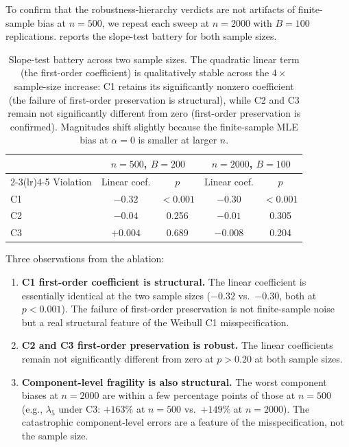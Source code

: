 To confirm that the robustness-hierarchy verdicts are not artifacts of
finite-sample bias at $n = 500$, we repeat each sweep at $n = 2000$ with
$B = 100$ replications.  reports the
slope-test battery for both sample sizes.

\begin{table}[htbp]
\centering
\caption{Slope-test battery across two sample sizes. The quadratic linear
term (the first-order coefficient) is qualitatively stable across the
$4\times$ sample-size increase: C1 retains its significantly nonzero
coefficient (the failure of first-order preservation is structural), while
C2 and C3 remain not significantly different from zero (first-order
preservation is confirmed). Magnitudes shift slightly because the
finite-sample MLE bias at $\alpha = 0$ is smaller at larger $n$.}
\label{tab:slope-tests-ablation}
\begin{tabular}{lcccc}
\toprule
              & \multicolumn{2}{c}{$n = 500$, $B = 200$} & \multicolumn{2}{c}{$n = 2000$, $B = 100$} \\
\cmidrule(lr){2-3}\cmidrule(lr){4-5}
Violation     & Linear coef. & $p$        & Linear coef. & $p$        \\
\midrule
C1            & $-0.32$      & $< 0.001$  & $-0.30$      & $< 0.001$  \\
C2            & $-0.04$      & 0.256      & $-0.01$      & 0.305      \\
C3            & $+0.004$     & 0.689      & $-0.008$     & 0.204      \\
\bottomrule
\end{tabular}
\end{table}

Three observations from the ablation:

\begin{enumerate}
    \item \textbf{C1 first-order coefficient is structural.} The linear
        coefficient is essentially identical at the two sample sizes
        ($-0.32$ vs.\ $-0.30$, both at $p < 0.001$). The failure of
        first-order preservation is not finite-sample noise but a real
        structural feature of the Weibull C1 misspecification.
    \item \textbf{C2 and C3 first-order preservation is robust.} The
        linear coefficients remain not significantly different from zero
        at $p > 0.20$ at both sample sizes.
    \item \textbf{Component-level fragility is also structural.} The
        worst component biases at $n = 2000$ are within a few percentage
        points of those at $n = 500$ (e.g., $\lambda_5$ under C3:
        $+163\%$ at $n = 500$ vs.\ $+149\%$ at $n = 2000$). The
        catastrophic component-level errors are a feature of the
        misspecification, not the sample size.
\end{enumerate}

